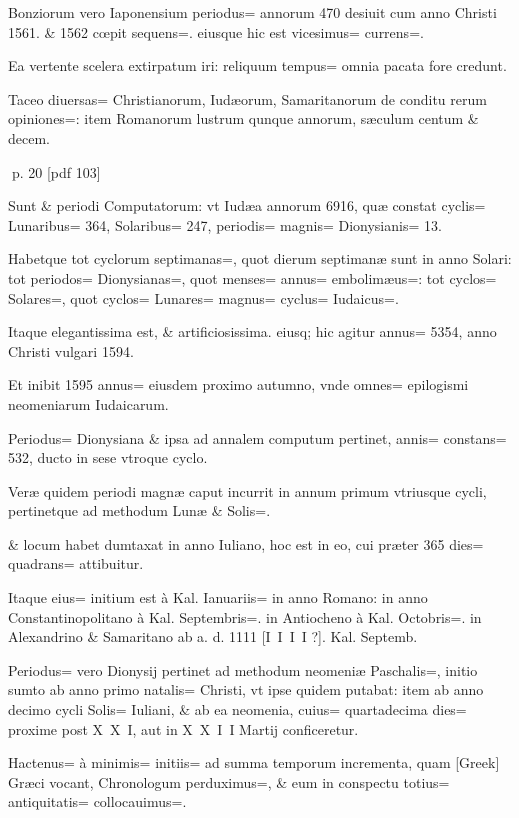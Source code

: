 \begin{parnumbers}
Bonziorum vero Iaponensium periodus= annorum 470 desiuit cum anno Christi 1561. \& 1562 cœpit sequens=. eiusque hic est vicesimus= currens=.

Ea vertente scelera extirpatum iri: reliquum tempus= omnia pacata fore credunt.

Taceo diuersas= Christianorum, Iudæorum, Samaritanorum de conditu rerum opiniones=: item Romanorum lustrum qunque annorum, sæculum centum \& decem.

\end{parnumbers}
\clearpage
p. 20 [pdf 103]

\begin{parnumbers}

Sunt \& periodi Computatorum: vt Iudæa  annorum 6916, quæ constat cyclis= Lunaribus= 364, Solaribus= 247, periodis= magnis= Dionysianis= 13.

Habetque tot cyclorum septimanas=, quot dierum septimanæ sunt in anno Solari: tot periodos= Dionysianas=, quot menses= annus= embolimæus=: tot cyclos= Solares=, quot cyclos= Lunares= magnus= cyclus= Iudaicus=.

Itaque elegantissima est, \& artificiosissima. eiusq; hic agitur annus= 5354, anno Christi vulgari 1594.

Et inibit 1595 annus= eiusdem proximo autumno, vnde omnes= epilogismi neomeniarum Iudaicarum.

Periodus= Dionysiana \& ipsa ad annalem computum pertinet, annis= constans= 532, ducto in sese vtroque cyclo.

Veræ quidem periodi magnæ caput incurrit in annum primum vtriusque cycli, pertinetque ad methodum Lunæ \& Solis=. 

\& locum habet dumtaxat in anno Iuliano, hoc est in eo, cui præter 365 dies= quadrans= attibuitur.

Itaque eius= initium est à Kal. Ianuariis= in anno Romano: in anno Constantinopolitano à Kal. Septembris=. in Antiocheno à Kal. Octobris=. in Alexandrino \& Samaritano ab a. d. 1111 [I I I I ?]. Kal. Septemb.

Periodus= vero Dionysij pertinet ad methodum neomeniæ Paschalis=, initio sumto ab anno primo natalis= Christi, vt ipse quidem putabat: item ab anno decimo cycli Solis= Iuliani, \& ab ea neomenia, cuius= quartadecima dies= proxime post X X I, aut in X X I I Martij conficeretur.

Hactenus= à minimis= initiis= ad summa temporum incrementa, quam [Greek] Græci vocant, Chronologum perduximus=, \& eum in conspectu totius= antiquitatis= collocauimus=. 


\end{parnumbers}

